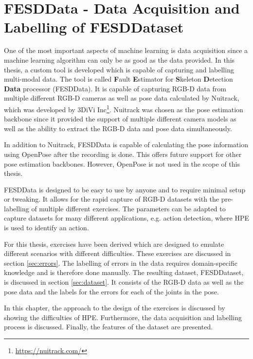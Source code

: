 \chapter[FESDData]{FESDData - Data Acquisition and Labelling of FESDDataset}
\label{sec:data_processing}

One of the most important aspects of machine learning is data acquisition since a machine learning algorithm can only be as good as the data provided. In this thesis, a custom tool is developed which is capable of capturing and labelling multi-modal data. The tool is called \textbf{F}ault \textbf{E}stimator for \textbf{S}keleton \textbf{D}etection \textbf{Data} processor (FESDData). It is capable of capturing RGB-D data from multiple different RGB-D cameras as well as pose data calculated by Nuitrack, which was developed by 3DiVi Inc\footnote{\url{https://nuitrack.com/}}. Nuitrack was chosen as the pose estimation backbone since it provided the support of multiple different camera models as well as the ability to extract the RGB-D data and pose data simultaneously.

In addition to Nuitrack, FESDData is capable of calculating the pose information using OpenPose after the recording is done. This offers future support for other pose estimation backbones. However, OpenPose is not used in the scope of this thesis.

FESDData is designed to be easy to use by anyone and to require minimal setup or tweaking. It allows for the rapid capture of RGB-D datasets with the pre-labelling of multiple different exercises. The parameters can be adapted to capture datasets for many different applications, e.g. action detection, where HPE is used to identify an action. 

For this thesis, exercises have been derived which are designed to emulate different scenarios with different difficulties. These exercises are discussed in section \ref{sec:errors}. The labelling of errors in the data requires domain-specific knowledge and is therefore done manually. The resulting dataset, FESDDataset, is discussed in section \ref{sec:dataset}. It consists of the RGB-D data as well as the pose data and the labels for the errors for each of the joints in the pose.

In this chapter, the approach to the design of the exercises is discussed by showing the difficulties of HPE. Furthermore, the data acquisition and labelling process is discussed. Finally, the features of the dataset are presented.






